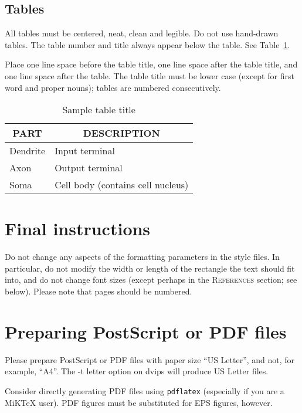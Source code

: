 \documentclass{article} %
\begin{document}
\subsection{Tables}

All tables must be centered, neat, clean and legible. Do not use hand-drawn
tables. The table number and title always appear below the table. See
Table~\ref{sample-table}.

Place one line space before the table title, one line space after the table
title, and one line space after the table. The table title must be lower case
(except for first word and proper nouns); tables are numbered consecutively.

\begin{table}[t]
\begin{center}
\begin{tabular}{ll}
\toprule
\multicolumn{1}{c}{\bf PART}  &\multicolumn{1}{c}{\bf DESCRIPTION} \\
\midrule
Dendrite         &Input terminal \\
Axon             &Output terminal \\
Soma             &Cell body (contains cell nucleus) \\
\bottomrule
\end{tabular}
\end{center}
\caption{Sample table title}\label{sample-table}
\end{table}




\section{Final instructions}
Do not change any aspects of the formatting parameters in the style files.
In particular, do not modify the width or length of the rectangle the text
should fit into, and do not change font sizes (except perhaps in the
\textsc{References} section; see below). Please note that pages should be
numbered.

\section{Preparing PostScript or PDF files}

Please prepare PostScript or PDF files with paper size ``US Letter'', and
not, for example, ``A4''. The -t
letter option on dvips will produce US Letter files.

Consider directly generating PDF files using \verb+pdflatex+
(especially if you are a MiKTeX user).
PDF figures must be substituted for EPS figures, however.
\end{document}
